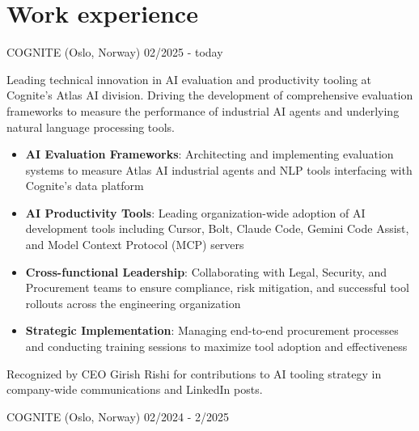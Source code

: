 \documentclass[singlesided,
               paper=a4,
               fontsize=10pt
              ]{my-resume}
\begin{document}
\section[\faBriefcase]{Work experience}
	{COGNITE (Oslo, Norway)}
    {02/2025 - today}
    {
        Leading technical innovation in AI evaluation and productivity tooling at Cognite's Atlas AI division. Driving the development of comprehensive evaluation frameworks to measure the performance of industrial AI agents and underlying natural language processing tools.

        \begin{itemize}[leftmargin=2em]
            \item \textbf{AI Evaluation Frameworks}: Architecting and implementing evaluation systems to measure Atlas AI industrial agents and NLP tools interfacing with Cognite's data platform
            \item \textbf{AI Productivity Tools}: Leading organization-wide adoption of AI development tools including Cursor, Bolt, Claude Code, Gemini Code Assist, and Model Context Protocol (MCP) servers
            \item \textbf{Cross-functional Leadership}: Collaborating with Legal, Security, and Procurement teams to ensure compliance, risk mitigation, and successful tool rollouts across the engineering organization
            \item \textbf{Strategic Implementation}: Managing end-to-end procurement processes and conducting training sessions to maximize tool adoption and effectiveness
        \end{itemize}

        Recognized by CEO Girish Rishi for contributions to AI tooling strategy in company-wide communications and LinkedIn posts.
    }
%    
	{COGNITE (Oslo, Norway)}
    {02/2024 - 2/2025}
\end{document}
